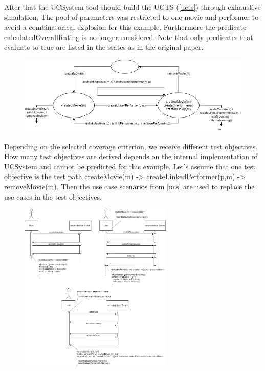 After that the UCSystem tool should build the UCTS (\autoref{ucts}) through exhaustive simulation. The pool of parameters was restricted to one movie and performer to avoid a combinatorical explosion for this example. Furthermore the predicate calculatedOverallRating is no longer considered. Note that only predicates that evaluate to true are listed in the states as in the original paper. 

\begin{figure}[h]
	\centering
	\includegraphics[width=1.0\textwidth]{img/ucts.png}
	\label{ucts}
\end{figure}

Depending on the selected coverage criterion, we receive different test objectives. How many test objectives are derived depends on the internal implementation of UCSystem and cannot be predicted for this example. Let's assume that one test objective is the test path createMovie(m) -> createLinkedPerformer(p,m) -> removeMovie(m). Then the use case scenarios from \autoref{ucs} are used to replace the use cases in the test objectives. 

\begin{figure}[h]
	\centering
	\includegraphics[width=0.65\textwidth]{img/ucs.png}
	\label{ucs}
\end{figure}

